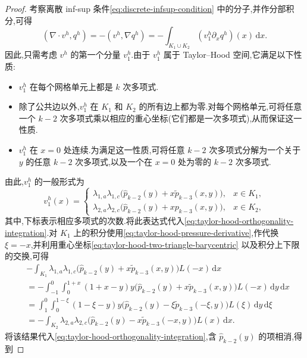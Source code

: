 \begin{proof}
考察离散 inf-sup 条件\cref{eq:discrete-infsup-condition} 中的分子,并作分部积分,可得
\begin{equation}\label{eq:taylor-hood-orthogonality-integration}
  (\nabla\cdot v^h,q^h)
  =-(v^h,\nabla q^h)
  =-\int_{K_1\cup K_2}
       (v_1^h\partial_xq^h)(x)\,\mathrm{d}x.
\end{equation}
因此,只需考虑 $v^h$ 的第一个分量 $v_1^h$.由于 $v_1^h$ 属于 Taylor--Hood 空间,它满足以下性质:
\begin{itemize}
\item $v_1^h$ 在每个网格单元上都是 $k$ 次多项式.
\item 除了公共边以外,$v_1^h$ 在 $K_1$ 和 $K_2$ 的所有边上都为零.对每个网格单元,可将任意一个 $k-2$ 次多项式乘以相应的重心坐标(它们都是一次多项式),从而保证这一性质.
\item $v_1^h$ 在 $x=0$ 处连续.为满足这一性质,可将任意 $k-2$ 次多项式分解为一个关于 $y$ 的任意 $k-2$ 次多项式,以及一个在 $x=0$ 处为零的 $k-2$ 次多项式.
\end{itemize}
由此,$v_1^h$ 的一般形式为
\[
v_1^h(x)=
\begin{cases}
  \lambda_{1,a}\lambda_{1,c}
      \bigl(\widehat p_{k-2}(y)+x\widetilde p_{k-3}(x,y)\bigr),
      &x\in K_1,\\
  \lambda_{2,a}\lambda_{2,c}
      \bigl(\widehat p_{k-2}(y)+xp_{k-3}(x,y)\bigr),
      &x\in K_2,
\end{cases}
\]
其中,下标表示相应多项式的次数.将此表达式代入\cref{eq:taylor-hood-orthogonality-integration}.对 $K_1$ 上的积分使用\cref{eq:taylor-hood-pressure-derivative},作代换 $\xi=-x$,并利用重心坐标\cref{eq:taylor-hood-two-triangle-barycentric} 以及积分上下限的交换,可得
\[
\begin{aligned}
  &-\int_{K_1}\lambda_{1,a}\lambda_{1,c}
       \bigl(\widehat p_{k-2}(y)+x\widetilde p_{k-3}(x,y)\bigr)
       L(-x)\,\mathrm{d}x\\
  &=-\int_{-1}^{0}\int_0^{1+x}
       (1+x-y)y\bigl(\widehat p_{k-2}(y)
                  +x\widetilde p_{k-3}(x,y)\bigr)L(-x)\,\mathrm{d}y\,\mathrm{d}x\\
  &=\int_1^0\int_0^{1-\xi}
       (1-\xi-y)y\bigl(\widehat p_{k-2}(y)
                  -\xi\widetilde p_{k-3}(-\xi,y)\bigr)L(\xi)\,\mathrm{d}y\,\mathrm{d}\xi\\
  &=-\int_{K_2}\lambda_{2,a}\lambda_{2,c}
       \bigl(\widehat p_{k-2}(y)
                  -x\widetilde p_{k-3}(-x,y)\bigr)L(x)\,\mathrm{d}x.
\end{aligned}
\]
将该结果代入\cref{eq:taylor-hood-orthogonality-integration},含 $\widehat p_{k-2}(y)$ 的项相消,得到

\end{proof}
